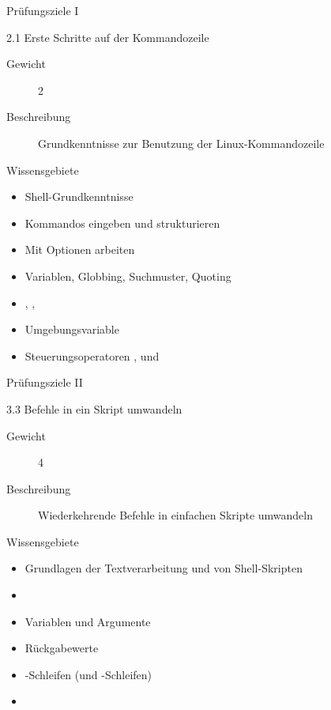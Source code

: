 \documentclass[aspectratio=43]{beamer}
\begin{document}
\begin{frame}{Prüfungsziele I}
  \begin{alertblock}{2.1 Erste Schritte auf der Kommandozeile}
    \begin{description}
      \item[Gewicht]  2
      \item[Beschreibung] Grundkenntnisse zur Benutzung der Linux-Kommandozeile
    \end{description}
       Wissensgebiete\\ 
        \begin{itemize}
          \item Shell-Grundkenntnisse
          \item Kommandos eingeben und strukturieren
          \item Mit Optionen arbeiten
          \item Variablen, Globbing, Suchmuster, Quoting
          \item {}, , 
          \item Umgebungsvariable 
          \item Steuerungsoperatoren \co{\&\&}, \co{\textbar\textbar} und \co{;}
        \end{itemize}
  \end{alertblock}
\end{frame}

\begin{frame}{Prüfungsziele II}
  \begin{alertblock}{3.3 Befehle in ein Skript umwandeln}
    \begin{description}
      \item[Gewicht]  4
      \item[Beschreibung] Wiederkehrende Befehle in einfachen Skripte umwandeln
    \end{description}
       Wissensgebiete\\ 
        \begin{itemize}
          \item Grundlagen der Textverarbeitung und von Shell-Skripten
          \item {}
          \item Variablen und Argumente
          \item Rückgabewerte
          \item {}-Schleifen (und -Schleifen)
          \item {}
        \end{itemize}
  \end{alertblock}
\end{frame}
\end{document}
